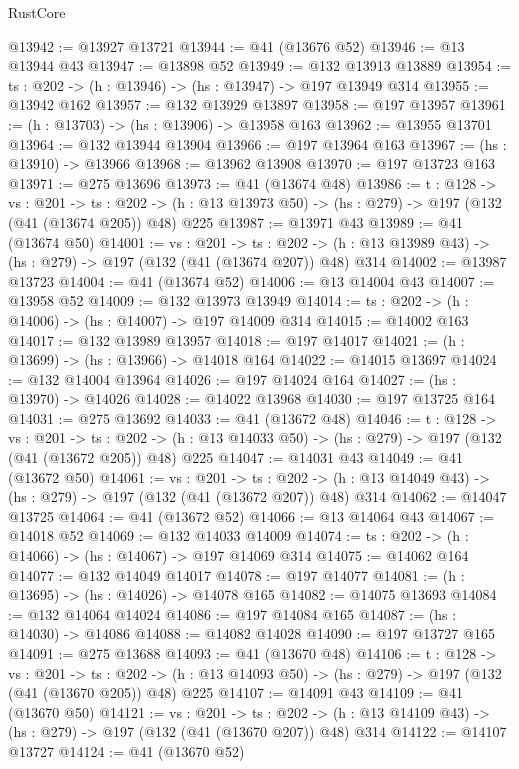 \begin{lexlean}{RustCore}
\begin{coremodule}
@13942 := @13927 @13721
@13944 := @41 (@13676 @52)
@13946 := @13 @13944 @43
@13947 := @13898 @52
@13949 := @132 @13913 @13889
@13954 := {ts : @202} -> (h : @13946) -> (hs : @13947) -> @197 @13949 @314
@13955 := @13942 @162
@13957 := @132 @13929 @13897
@13958 := @197 @13957
@13961 := (h : @13703) -> (hs : @13906) -> @13958 @163
@13962 := @13955 @13701
@13964 := @132 @13944 @13904
@13966 := @197 @13964 @163
@13967 := (hs : @13910) -> @13966
@13968 := @13962 @13908
@13970 := @197 @13723 @163
@13971 := @275 @13696
@13973 := @41 (@13674 @48)
@13986 := {t : @128} ->
  {vs : @201} ->
  {ts : @202} -> (h : @13 @13973 @50) -> (hs : @279) -> @197 (@132 (@41 (@13674 @205)) @48) @225
@13987 := @13971 @43
@13989 := @41 (@13674 @50)
@14001 := {vs : @201} ->
  {ts : @202} -> (h : @13 @13989 @43) -> (hs : @279) -> @197 (@132 (@41 (@13674 @207)) @48) @314
@14002 := @13987 @13723
@14004 := @41 (@13674 @52)
@14006 := @13 @14004 @43
@14007 := @13958 @52
@14009 := @132 @13973 @13949
@14014 := {ts : @202} -> (h : @14006) -> (hs : @14007) -> @197 @14009 @314
@14015 := @14002 @163
@14017 := @132 @13989 @13957
@14018 := @197 @14017
@14021 := (h : @13699) -> (hs : @13966) -> @14018 @164
@14022 := @14015 @13697
@14024 := @132 @14004 @13964
@14026 := @197 @14024 @164
@14027 := (hs : @13970) -> @14026
@14028 := @14022 @13968
@14030 := @197 @13725 @164
@14031 := @275 @13692
@14033 := @41 (@13672 @48)
@14046 := {t : @128} ->
  {vs : @201} ->
  {ts : @202} -> (h : @13 @14033 @50) -> (hs : @279) -> @197 (@132 (@41 (@13672 @205)) @48) @225
@14047 := @14031 @43
@14049 := @41 (@13672 @50)
@14061 := {vs : @201} ->
  {ts : @202} -> (h : @13 @14049 @43) -> (hs : @279) -> @197 (@132 (@41 (@13672 @207)) @48) @314
@14062 := @14047 @13725
@14064 := @41 (@13672 @52)
@14066 := @13 @14064 @43
@14067 := @14018 @52
@14069 := @132 @14033 @14009
@14074 := {ts : @202} -> (h : @14066) -> (hs : @14067) -> @197 @14069 @314
@14075 := @14062 @164
@14077 := @132 @14049 @14017
@14078 := @197 @14077
@14081 := (h : @13695) -> (hs : @14026) -> @14078 @165
@14082 := @14075 @13693
@14084 := @132 @14064 @14024
@14086 := @197 @14084 @165
@14087 := (hs : @14030) -> @14086
@14088 := @14082 @14028
@14090 := @197 @13727 @165
@14091 := @275 @13688
@14093 := @41 (@13670 @48)
@14106 := {t : @128} ->
  {vs : @201} ->
  {ts : @202} -> (h : @13 @14093 @50) -> (hs : @279) -> @197 (@132 (@41 (@13670 @205)) @48) @225
@14107 := @14091 @43
@14109 := @41 (@13670 @50)
@14121 := {vs : @201} ->
  {ts : @202} -> (h : @13 @14109 @43) -> (hs : @279) -> @197 (@132 (@41 (@13670 @207)) @48) @314
@14122 := @14107 @13727
@14124 := @41 (@13670 @52)

\end{coremodule}
\end{lexlean}
